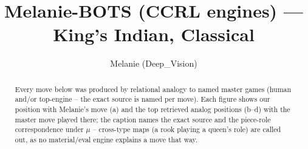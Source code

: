 \documentclass[11pt]{article}
\title{Melanie-BOTS (CCRL engines) — King's Indian, Classical}
\author{Melanie (Deep\_Vision)}
\date{}
\begin{document}
\maketitle

\begin{abstract}Every move below was produced by relational analogy to named master games (human and/or top-engine -- the exact source is named per move). Each figure shows our position with Melanie's move (a) and the top retrieved analog positions (b--d) with the master move played there; the caption names the exact source and the piece-role correspondence under $\mu$ -- cross-type maps (a rook playing a queen's role) are called out, as no material/eval engine explains a move that way.\end{abstract}

\begin{figure}[p]\centering
\begin{subfigure}{0.46\textwidth}\centering
\resizebox{\linewidth}{!}{%
\newchessgame
\chessboard[
  setfen={rnbq1rk1/ppp2pbp/3p1np1/4p3/2PPP3/2N2N2/PP2BPPP/1RBQK2R b K - 1 7},
  showmover=false,
  pgfstyle=straightmove, color=movearrow, markmove={f6-g4}
]}
\caption{}
\end{subfigure}\hfill
\begin{subfigure}{0.46\textwidth}\centering
\resizebox{\linewidth}{!}{%
\newchessgame
\chessboard[
  setfen={rnbq1rk1/ppp2pbp/3p1np1/4p3/2PPP3/2N1BN2/PP2BPPP/R2QK2R b KQ - 1 7},
  showmover=false,
  pgfstyle=straightmove, color=movearrow, markmove={f6-g4}
]}
\caption{}
\end{subfigure}
\\[4pt]
\begin{subfigure}{0.46\textwidth}\centering
\resizebox{\linewidth}{!}{%
\newchessgame
\chessboard[
  setfen={rnbq1rk1/ppp2pbp/3p1np1/4p3/2PPP3/2N1BN2/PP2BPPP/R2QK2R b KQ - 1 7},
  showmover=false,
  pgfstyle=straightmove, color=movearrow, markmove={f6-g4}
]}
\caption{}
\end{subfigure}\hfill
\begin{subfigure}{0.46\textwidth}\centering
\resizebox{\linewidth}{!}{%
\newchessgame
\chessboard[
  setfen={rnbq1rk1/ppp2pbp/3p1np1/4p3/2PPP3/2N1BN2/PP2BPPP/R2QK2R b KQ - 1 7},
  showmover=false,
  pgfstyle=straightmove, color=movearrow, markmove={f6-g4}
]}
\caption{}
\end{subfigure}

\end{figure}
\end{document}
